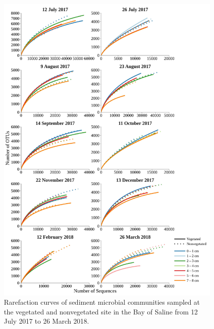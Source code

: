\documentclass[12pt,]{article}
\begin{document}
\begin{figure}[H]

{\centering \includegraphics[width=0.85\linewidth]{../results/figures/rarefaction_a} 

}

\caption{Rarefaction curves of sediment microbial communities sampled at the vegetated and nonvegetated site in the Bay of Saline from 12 July 2017 to 26 March 2018.\label{rarefaction_a}}\label{fig:unnamed-chunk-1}
\end{figure}
\end{document}
